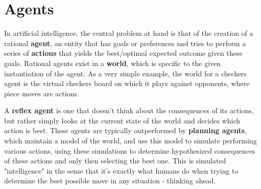 \documentclass[11pt,fleqn]{article}
\def\title{Note \the\lecturenumber}
\begin{document}
\maketitle

\section*{Agents}

In artificial intelligence, the central problem at hand is that of the creation of a rational \textbf{agent}, an entity that has goals or preferences and tries to perform a series of \textbf{actions} that yields the best/optimal expected outcome given these goals. Rational agents exist in a \textbf{world}, which is specific to the given instantiation of the agent. As a very simple example, the world for a checkers agent is the virtual checkers board on which it plays against opponents, where piece moves are actions. 

A \textbf{reflex agent} is one that doesn't think about the consequences of its actions, but rather simply looks at the current state of the world and decides which action is best. These agents are typically outperformed by \textbf{planning agents}, which maintain a model of the world, and use this model to simulate performing various actions, using these simulations to determine hypothesized consequences of these actions and only then selecting the best one. This is simulated "intelligence" in the sense that it's exactly what humans do when trying to determine the best possible move in any situation - thinking ahead.


\end{document}
\end{document}
